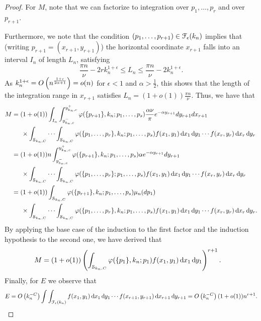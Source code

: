 \begin{proof}
For $M$, note that we can factorize to integration over $p_1,\dots,p_r$ and over $p_{r+1}$.

Furthermore, we note that the condition $(p_1,\dots,p_{r+1})\in \mathcal{F}_\epsilon(k_n)$ implies that (writing $p_{r+1}=(x_{r+1},y_{r+1})$) the horizontal coordinate $x_{r+1}$ falls into an interval $I_n$ of length $L_n$, satisfying
\[
	\frac{\pi n}{\nu}-2rk_n^{1+\epsilon}\leq L_n\leq \frac{\pi n}{\nu}-2k_n^{1+\epsilon}.
\]
As $k_n^{1+\epsilon} = O\left(n^{\frac{1+\epsilon}{2\alpha+1}}\right) = o(n)$ for $\epsilon<1$ and $\alpha>\frac{1}{2}$, this shows that the length of the integration range in $x_{r+1}$ satisfies $L_n=(1+o(1))\frac{\pi n}{\nu}$. Thus, we have that
\begin{align*}
	M &= (1+o(1))\int_{I_n}\int_{y_{k_n,c}^-}^{y_{k_n,c}^+} \varphi(\{p_{r+1}\}, k_n ;p_1,\dots,p_s)
		\frac{\alpha\nu}{\pi} e^{-\alpha y_{r+1}}dy_{r+1}dx_{r+1}\\
	&\hspace{15pt} \times \int_{\stripknc} \cdots \int_{\stripknc} 
		\varphi(\{p_1,\dots,p_r\}, k_n ;p_1,\dots,p_s)f(x_1,y_1) \dd x_1 \dd y_1 \cdots f(x_{r},y_{r})\dd x_{r} \dd y_{r}\\
	&=(1+o(1))n\int_{y_{k_n,c}^-}^{y_{k_n,c}^+} \varphi(\{p_{r+1}\}, k_n ;p_1,\dots,p_s)\alpha e^{-\alpha y_{r+1}}dy_{r+1}\\
	&\hspace{15pt} \times \int_{\stripknc} \cdots \int_{\stripknc} \varphi(\{p_1,\dots,p_r\};p_1,\dots,p_s)
		f(x_1,y_1) \dd x_1 \dd y_1 \cdots f(x_{r},y_{r})\dd x_{r} \dd y_{r}\\
	&=(1+o(1))\int_{\stripknc} \varphi(\{p_{r+1}\}, k_n ;p_1,\dots,p_s)\mu_n(dp_1)\\
	&\hspace{15pt} \times\int_{\stripknc} \cdots \int_{\stripknc} \varphi(\{p_1,\dots,p_r\}, k_n ;p_1,\dots,p_s)
		f(x_1,y_1) \dd x_1 \dd y_1 \cdots f(x_{r},y_{r})\dd x_{r} \dd y_{r}.
\end{align*}
By applying the base case of the induction to the first factor and the induction hypothesis to the second one, we have derived that
\begin{align*}
M&=(1+o(1))\left(\int_{\mathcal{S}_{k_n,C}} \varphi(\{p_1\}, k_n ;p_1) f(x_1,y_1) \operatorname{\mathrm{d}\hspace{-2pt}} x_1 \operatorname{\mathrm{d}\hspace{-2pt}} y_1 \right)^{r+1}.
\end{align*}
Finally, for $E$ we observe that
\begin{align*}
	E=\bigO{k_n^{-C}}\int \int_{\Fcal_\epsilon(k_n)} 
	f(x_1,y_1) \dd x_1 \dd y_1 \cdots f(x_{r+1},y_{r+1})\dd x_{r+1} \dd y_{r+1} 
	= \bigO{k_n^{-C}}(1+o(1))n^{r+1}.

\end{align*}
\end{proof}

